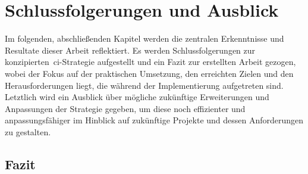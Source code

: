 
\section{Schlussfolgerungen und Ausblick} \label{sec:06-prospect}

Im folgenden, abschließenden Kapitel werden die zentralen Erkenntnisse und Resultate dieser Arbeit reflektiert.
Es werden Schlussfolgerungen zur konzipierten\ \acrshort{ci}-Strategie aufgestellt und ein Fazit zur erstellten
Arbeit gezogen, wobei der Fokus auf der praktischen Umsetzung, den erreichten Zielen und den Herausforderungen liegt,
die während der Implementierung aufgetreten sind.
Letztlich wird ein Ausblick über mögliche zukünftige Erweiterungen und Anpassungen der Strategie gegeben, um diese noch
effizienter und anpassungsfähiger im Hinblick auf zukünftige Projekte und dessen Anforderungen zu gestalten.

\subsection{Fazit} \label{subsec:06-prospect-1}

